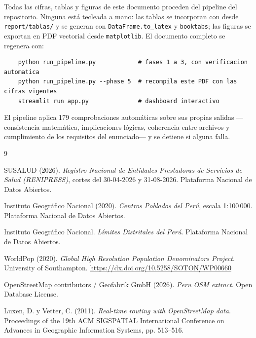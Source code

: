 \documentclass[11pt,a4paper]{article}
\begin{document}
Todas las cifras, tablas y figuras de este documento proceden del pipeline del repositorio.
Ninguna está tecleada a mano: las tablas se incorporan con \verb|| desde
\texttt{report/tablas/} y se generan con \texttt{DataFrame.to\_latex} y \texttt{booktabs}; las
figuras se exportan en PDF vectorial desde \texttt{matplotlib}. El documento completo se
regenera con:

\begin{verbatim}
    python run_pipeline.py            # fases 1 a 3, con verificacion automatica
    python run_pipeline.py --phase 5  # recompila este PDF con las cifras vigentes
    streamlit run app.py              # dashboard interactivo
\end{verbatim}

El pipeline aplica \num{179} comprobaciones automáticas sobre sus propias salidas
—consistencia matemática, implicaciones lógicas, coherencia entre archivos y cumplimiento de
los requisitos del enunciado— y se detiene si alguna falla.

\begin{thebibliography}{9}

 SUSALUD (2026). \emph{Registro Nacional de Entidades Prestadoras de
Servicios de Salud (RENIPRESS)}, cortes del 30-04-2026 y 31-08-2026. Plataforma Nacional de
Datos Abiertos.

 Instituto Geográfico Nacional (2020). \emph{Centros Poblados del Perú},
escala 1:100\,000. Plataforma Nacional de Datos Abiertos.

 Instituto Geográfico Nacional. \emph{Límites Distritales del Perú}.
Plataforma Nacional de Datos Abiertos.

 WorldPop (2020). \emph{Global High Resolution Population Denominators
Project}. University of Southampton. \url{https://dx.doi.org/10.5258/SOTON/WP00660}

 OpenStreetMap contributors / Geofabrik GmbH (2026). \emph{Peru OSM extract}.
Open Database License.

 Luxen, D. y Vetter, C. (2011). \emph{Real-time routing with OpenStreetMap
data}. Proceedings of the 19th ACM SIGSPATIAL International Conference on Advances in
Geographic Information Systems, pp. 513--516.

\end{thebibliography}
\end{document}
